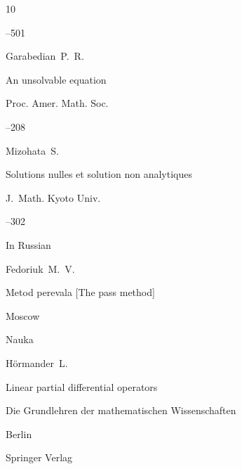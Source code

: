 \begin{thebibliography}{10}


--501







\by Garabedian~P.~R.

\paper  An unsolvable equation

\jour Proc. Amer. Math. Soc. 




--208





\by Mizohata~S.

\paper  Solutions nulles et solution non analytiques


\jour J.~Math. Kyoto Univ.



--302





\lang In Russian

\by Fedoriuk~M.~V.

\book  Metod perevala \rm [The pass method]

\publaddr Moscow

\publ Nauka










\by H\"ormander~L.

\book  Linear partial differential operators


\serial Die Grundlehren der mathematischen Wissenschaften


\publaddr Berlin

\publ Springer Verlag


\end{thebibliography}

